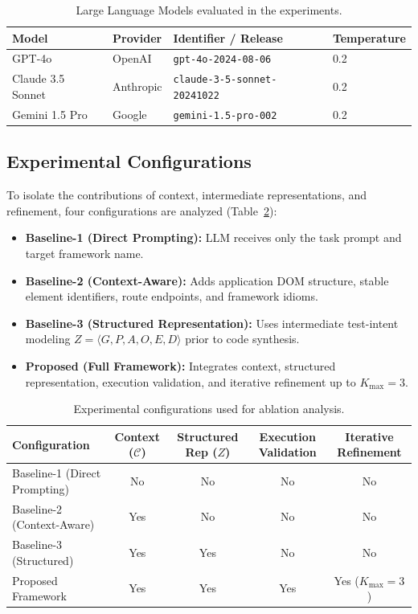 \documentclass[pdflatex,sn-mathphys-num]{sn-jnl}
\begin{document}
\begin{table}[t]
\centering
\caption{Large Language Models evaluated in the experiments.}
\label{tab:models}
\small
\begin{tabular}{llll}
\toprule
\textbf{Model} & \textbf{Provider} & \textbf{Identifier / Release} & \textbf{Temperature} \\
\midrule
GPT-4o & OpenAI & \texttt{gpt-4o-2024-08-06} & 0.2 \\
Claude 3.5 Sonnet & Anthropic & \texttt{claude-3-5-sonnet-20241022} & 0.2 \\
Gemini 1.5 Pro & Google & \texttt{gemini-1.5-pro-002} & 0.2 \\
\bottomrule
\end{tabular}
\end{table}

\subsection{Experimental Configurations}
\label{subsec:configurations}

To isolate the contributions of context, intermediate representations, and
refinement, four configurations are analyzed (Table~\ref{tab:configurations}):
\begin{itemize}[leftmargin=*]
    \item \textbf{Baseline-1 (Direct Prompting):} LLM receives only the task prompt
    and target framework name.
    \item \textbf{Baseline-2 (Context-Aware):} Adds application DOM structure, stable
    element identifiers, route endpoints, and framework idioms.
    \item \textbf{Baseline-3 (Structured Representation):} Uses intermediate
    test-intent modeling $Z = \langle G, P, A, O, E, D \rangle$ prior to code synthesis.
    \item \textbf{Proposed (Full Framework):} Integrates context, structured
    representation, execution validation, and iterative refinement up to $K_{\max} = 3$.
\end{itemize}

\begin{table}[t]
\centering
\caption{Experimental configurations used for ablation analysis.}
\label{tab:configurations}
\small
\begin{tabular}{lcccc}
\toprule
\textbf{Configuration} &
\textbf{Context ($\mathcal{C}$)} &
\textbf{Structured Rep ($Z$)} &
\textbf{Execution Validation} &
\textbf{Iterative Refinement} \\
\midrule
Baseline-1 (Direct Prompting) & No & No & No & No \\
Baseline-2 (Context-Aware) & Yes & No & No & No \\
Baseline-3 (Structured) & Yes & Yes & No & No \\
Proposed Framework & Yes & Yes & Yes & Yes ($K_{\max} = 3$) \\
\bottomrule
\end{tabular}
\end{table}
\end{document}
